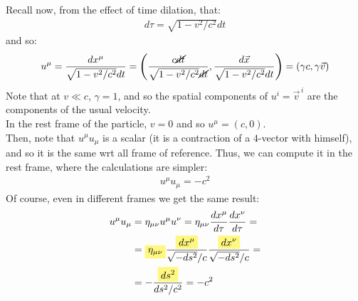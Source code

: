 \documentclass[../template.tex]{subfiles}
\begin{document}
Recall now, from the effect of time dilation, that:
\begin{align*}
    d \tau = \sqrt{1- v^2/c^2} dt
\end{align*}
and so:
\begin{align*}
    u^\mu = \frac{dx^\mu}{\sqrt{1-v^2/c^2}dt} = \left(\frac{c \cancel{dt}}{\sqrt{1-v^2/c^2}\cancel{dt}}, \frac{d \vec{x}}{\sqrt{1-v^2/c^2}dt}  \right)  = (\gamma c, \gamma \vec{v})
\end{align*}
Note that at $v \ll c$, $\gamma = 1$, and so the spatial components of $u^i = \vec{v}^{\,i}$ are the components of the usual velocity.\\
In the rest frame of the particle, $v=0$ and so $u^\mu = (c,0)$.\\
Then, note that $u^\mu u_\mu$ is a scalar (it is a contraction of a $4$-vector with himself), and so it is the same wrt all frame of reference. Thus, we can compute it in the rest frame, where the calculations are simpler:
\begin{align*}
    u^\mu u_\mu = -c^2
\end{align*} 
Of course, even in different frames we get the same result:
\begin{align*}
    u^\mu u_\mu &= \eta_{\mu \nu} u^\mu u^\nu = \eta_{\mu \nu} \frac{dx^\mu}{d \tau} \frac{dx^\nu}{d \tau} = \\
    &=  \hlc{Yellow}{\eta_{\mu \nu}}  \frac{\hlc{Yellow}{dx^\mu}}{\sqrt{-ds^2}/c} \frac{\hlc{Yellow}{dx^\nu}}{\sqrt{-ds^2}/c} = \\
    &=  - \frac{\hlc{Yellow}{ds^2}}{ds^2/c^2} = -c^2 
\end{align*}
\end{document}
